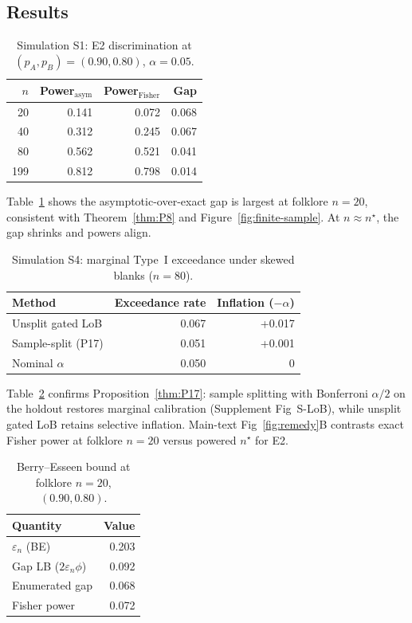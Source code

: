 \documentclass[11pt,a4paper]{article}
\theoremstyle{definition}
\begin{document}
\subsection{Results}

\begin{table}[h]
\centering
\caption{Simulation S1: E2 discrimination at $(p_A,p_B)=(0.90,0.80)$, $\alpha=0.05$.}
\label{tab:sim-g2}
\begin{tabular}{@{}rrrr@{}}
\toprule
$n$ & Power$_{\mathrm{asym}}$ & Power$_{\mathrm{Fisher}}$ & Gap \\
\midrule
20  & 0.141 & 0.072 & 0.068 \\
40  & 0.312 & 0.245 & 0.067 \\
80  & 0.562 & 0.521 & 0.041 \\
199 & 0.812 & 0.798 & 0.014 \\
\bottomrule
\end{tabular}
\end{table}

Table~\ref{tab:sim-g2} shows the asymptotic-over-exact gap is largest at folklore
$n=20$, consistent with Theorem~\ref{thm:P8} and Figure~\ref{fig:finite-sample}.
At $n\approx n^\star$, the gap shrinks and powers align.

\begin{table}[h]
\centering
\caption{Simulation S4: marginal Type~I exceedance under skewed blanks ($n=80$).}
\label{tab:sim-split}
\begin{tabular}{@{}lrr@{}}
\toprule
Method & Exceedance rate & Inflation ($-\alpha$) \\
\midrule
Unsplit gated LoB       & 0.067 & +0.017 \\
Sample-split (P17)      & 0.051 & +0.001 \\
Nominal $\alpha$        & 0.050 & 0 \\
\bottomrule
\end{tabular}
\end{table}

Table~\ref{tab:sim-split} confirms Proposition~\ref{thm:P17}: sample splitting with
Bonferroni $\alpha/2$ on the holdout restores marginal calibration (Supplement Fig~S-LoB),
while unsplit gated LoB retains selective inflation. Main-text Fig~\ref{fig:remedy}B
contrasts exact Fisher power at folklore $n=20$ versus powered $n^\star$ for E2.

\begin{table}[h]
\centering
\caption{Berry--Esseen bound at folklore $n=20$, $(0.90,0.80)$.}
\label{tab:sim-be}
\begin{tabular}{@{}lr@{}}
\toprule
Quantity & Value \\
\midrule
$\varepsilon_n$ (BE) & 0.203 \\
Gap LB ($2\varepsilon_n\phi$) & 0.092 \\
Enumerated gap & 0.068 \\
Fisher power & 0.072 \\
\bottomrule
\end{tabular}
\end{table}
\end{document}
